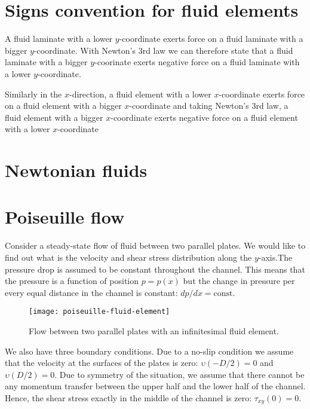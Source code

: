 
\section{Signs convention for fluid elements}

A fluid laminate with a lower $y$-coordinate exerts force on a fluid laminate with a bigger $y$-coordinate. With Newton's 3rd law we can therefore state that a fluid laminate with a bigger $y$-coorinate exerts negative force on a fluid laminate with a lower $y$-coordinate.

Similarly in the $x$-direction, a fluid element with a lower $x$-coordinate exerts force on a fluid element with a bigger $x$-coordinate and taking Newton's 3rd law, a fluid element with a bigger $x$-coordinate exerts negative force on a fluid element with a lower $x$-coordinate

\section{Newtonian fluids}



\section{Poiseuille flow}

Consider a steady-state flow of fluid between two parallel plates. We would like to find out what is the velocity and shear stress distribution along the $y$-axis.The pressure drop is assumed to be constant throughout the channel. This means that the pressure is a function of position $p = p(x)$ but the change in pressure per every equal distance in the channel is constant: $dp/dx = \text{const}$.

\begin{figure}[H]
\centering\texttt{[image: poiseuille-fluid-element]}
\caption{Flow between two parallel plates with an infinitesimal fluid element.}			
\label{fig:poiseuille-fluid-element}
\end{figure}

We also have three boundary conditions. Due to a no-slip condition we assume that the velocity at the surfaces of the plates is zero: $\upsilon(-D/2) = 0$ and $\upsilon(D/2) = 0$. Due to symmetry of the situation, we assume that there cannot be any momentum transfer between the upper half and the lower half of the channel. Hence, the shear stress exactly in the middle of the channel is zero: $\tau_{xy}(0) = 0$.


